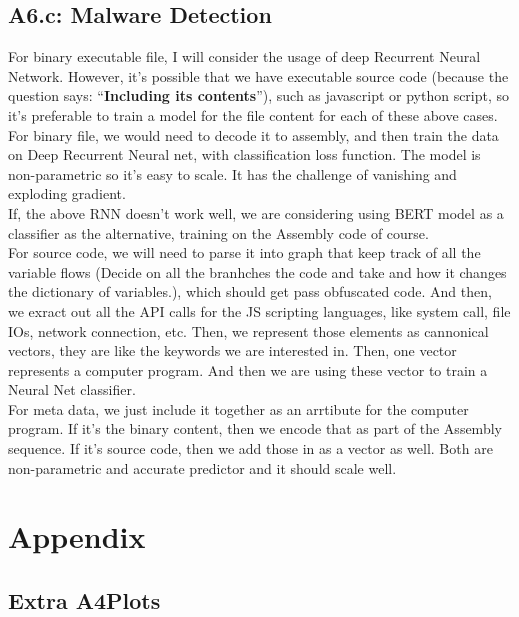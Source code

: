 \documentclass[]{article}
\begin{document}
    \subsection*{A6.c: Malware Detection}
        For binary executable file, I will consider the usage of deep Recurrent Neural Network. However, it's possible that we have executable source code (because the question says: ``\textbf{Including its contents}''), such as javascript or python script, so it's preferable to train a model for the file content for each of these above cases. 
        \\[1.1em]
        For binary file, we would need to decode it to assembly, and then train the data on Deep Recurrent Neural net, with classification loss function. The model is non-parametric so it's easy to scale. It has the challenge of vanishing and exploding gradient. 
        \\[1.1em]
        If, the above RNN doesn't work well, we are considering using BERT model as a classifier as the alternative, training on the Assembly code of course. 
        \\[1.1em]
        For source code, we will need to parse it into graph that keep track of all the variable flows (Decide on all the branhches the code and take and how it changes the dictionary of variables.), which should get pass obfuscated code. And then, we exract out all the API calls for the JS scripting languages, like system call, file IOs, network connection, etc. Then, we represent those elements as cannonical vectors, they are like the keywords we are interested in. Then, one vector represents a computer program. And then we are using these vector to train a Neural Net classifier. 
        \\[1.1em]
        For meta data, we just include it together as an arrtibute for the computer program. If it's the binary content, then we encode that as part of the Assembly sequence. If it's source code, then we add those in as a vector as well. Both are non-parametric and accurate predictor and it should scale well. 

    

\section*{Appendix}
    \subsection*{Extra A4Plots}
\end{document}
